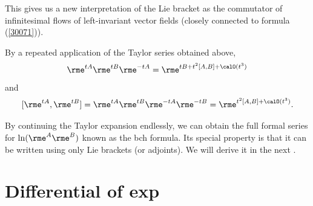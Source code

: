 This gives us a new interpretation of the Lie bracket as the  commutator of infinitesimal flows of left-invariant vector fields (closely connected to formula (\ref{30071})).
\begin{cor}
    By a repeated application of the Taylor series obtained above,
    \[\rme^{tA}\rme^{tB}\rme^{-tA}=\rme^{tB+t^2[A,B]+\calO(t^3)}\]
    and
    \[[\rme^{tA},\rme^{tB}]=\rme^{tA}\rme^{tB}\rme^{-tA}\rme^{-tB}=\rme^{t^2[A,B]+\calO(t^3)}.\]
\end{cor}


\begin{rem}
    By continuing the Taylor expansion endlessly, we can obtain the full formal series for $\ln(\rme^A \rme^B)$ known as the \gls{bch} formula. Its special property is that it can be written using only Lie brackets (or adjoints). We will derive it in the next \sect.
\end{rem}










\section{Differential of exp}

